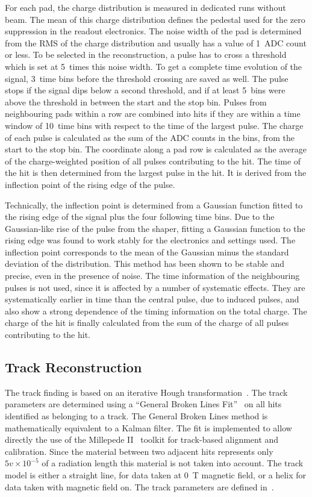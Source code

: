 \documentclass[preprint]{elsarticle}
\begin{document}
For each pad, the charge distribution is measured in dedicated runs without beam. The mean of this charge distribution defines the pedestal used for the zero suppression in the readout electronics. The noise width of the pad is determined from the RMS of the charge distribution and usually has a value of 1~ADC count or less. 
To be selected in the reconstruction, a pulse has to cross a threshold which is set at 5~times this noise width. To get a complete time evolution of the signal, 3~time bins before the threshold crossing are saved as well. The pulse stops if the signal dips below a second threshold, and if at least 5~bins were above the threshold in between the start and the stop bin. Pulses from neighbouring pads within a row are combined into hits if they are within a time window of 10~time bins with respect to the time of the largest pulse. The charge of each pulse is calculated as the sum of the ADC counts in the bins, from the start to the stop bin. The coordinate along a pad row is calculated as the average of the charge-weighted position of all pulses contributing to the hit. The time of the hit is then determined from the largest pulse in the hit. It is derived from the inflection point of the rising edge of the pulse. 

Technically, the inflection point is determined from a Gaussian function fitted to the rising edge of the signal plus the four following time bins. Due to the Gaussian-like rise of the pulse from the shaper, fitting a Gaussian function to the rising edge was found to work stably for the electronics and settings used. The inflection point corresponds to the mean of the Gaussian minus the standard deviation of the distribution. This method has been shown to be stable and precise, even in the presence of noise. The time information of the neighbouring pulses is not used, since it is affected by a number of systematic effects. They are systematically earlier in time than the central pulse, due to induced pulses, and also show a strong dependence of the timing information on the total charge. 
The charge of the hit is finally calculated from the sum of the charge of all pulses contributing to the hit. 

\subsection{Track Reconstruction}
\label{sec:trackreco}
The track finding is based on an iterative Hough transformation~\cite{KleinwortHough}. The track parameters are determined using a ``General Broken Lines Fit''~\cite{KleinwortGBL,GBLwiki} on all hits identified as belonging to a track. The General Broken Lines method is mathematically equivalent to a Kalman filter. The fit is implemented to allow directly the use of the Millepede II~\cite{millepedeNIM,millepedeWiki} toolkit for track-based alignment and calibration. Since the material between two adjacent hits represents only $5 v\times 10^{-5}$ of a radiation length this material is not taken into account. 
The track model is either a straight line, for data taken at \SI{0}{\tesla} magnetic field, or a helix for data taken with magnetic field on. The track parameters are defined in~\cite{LC-DET-2006-004}.
\end{document}
